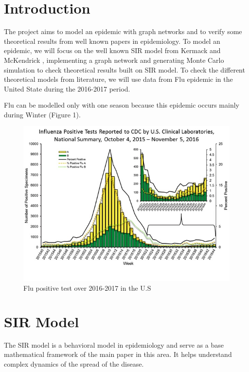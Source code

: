 \section{Introduction}

The project aims to model an epidemic with graph networks and to verify some theoretical results from well known papers in epidemiology. To model an epidemic, we will focus on the well known SIR model from Kermack and McKendrick \cite{Kermack700}, implementing a graph network and generating Monte Carlo simulation to check theoretical results built on SIR model. 
To check the different theoretical models from literature, we will use data from Flu epidemic in the United State during the 2016-2017 period.

Flu can be modelled only with one season because this epidemic occurs mainly during Winter (Figure 1).

\begin{figure}
    \centering
    \includegraphics[scale=0.5]{WHONPHL44_small.jpg}
    \caption{Flu positive test over 2016-2017 in the U.S}
    \label{fig:my_label}
\end{figure}



\section{SIR Model}

The SIR model is a behavioral model in epidemiology and serve as a base mathematical framework of the main paper in this area. It helps understand complex dynamics of the spread of the disease.

